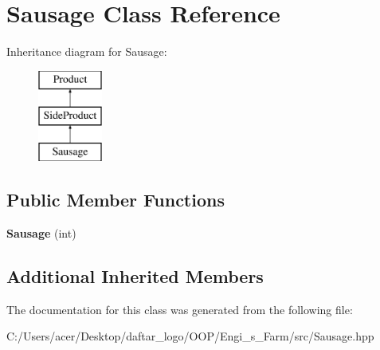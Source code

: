 \hypertarget{class_sausage}{}\section{Sausage Class Reference}
\label{class_sausage}
Inheritance diagram for Sausage\+:\begin{figure}[H]
\begin{center}
\leavevmode
\includegraphics[height=3.000000cm]{class_sausage}
\end{center}
\end{figure}
\subsection*{Public Member Functions}
\begin{DoxyCompactItemize}
\item 
\mbox{\label{class_sausage_ac8ca7d3016fc748234e12839922955fb}} 
{\bfseries Sausage} (int)
\end{DoxyCompactItemize}
\subsection*{Additional Inherited Members}


The documentation for this class was generated from the following file\+:\begin{DoxyCompactItemize}
\item 
C\+:/\+Users/acer/\+Desktop/daftar\+\_\+logo/\+O\+O\+P/\+Engi\+\_\+s\+\_\+\+Farm/src/Sausage.\+hpp\end{DoxyCompactItemize}

